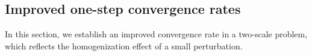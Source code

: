 \documentclass[reqno,12pt]{amsart} %
\theoremstyle{definition}
\theoremstyle{remark}
\numberwithin{equation}{section}
\begin{document}

\subsection{Improved one-step convergence rates}\label{sec_case-n=1}
In this section, we establish an improved convergence rate in a two-scale problem, which reflects the homogenization effect of a small perturbation.
\end{document}

